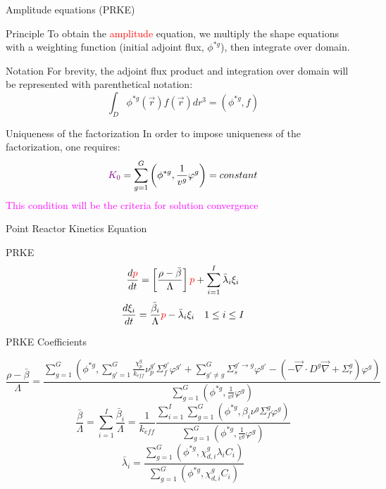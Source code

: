 \documentclass[8pt]{beamer}
\renewcommand{\div}{\vec{\nabla}\! \cdot \!}
\newcommand{\grad}{\vec{\nabla}}
\newcommand{\be}{\begin{equation*}}
\newcommand{\ee}{\end{equation*}}
\newcommand{\keff}{\ensuremath{k_{\textit{eff}}}}
\newcommand{\tcr}[1]{\textcolor{red}{#1}}
\newcommand{\tcm}[1]{\textcolor{magenta}{#1}}
\newcommand{\tcp}[1]{\textcolor{violet}{#1}}
\begin{document}
\begin{frame}{Amplitude equations (PRKE)}

\begin{block}{Principle}
To obtain the \tcr{amplitude} equation, we multiply the shape equations with a weighting 
function (initial adjoint flux, $\phi^{*g}$), then integrate over domain.  
\end{block}

\begin{block}{Notation}
For brevity, the adjoint flux product and integration over domain will be represented with parenthetical notation:
\[
\int_D\phi^{*g}(\vec{r})f(\vec{r})dr^3=\left(\phi^{*g},f\right)
\]
\end{block}


\begin{block}{Uniqueness of the factorization}
In order to impose uniqueness of the factorization, one requires:
\[
\tcp{K_0} = \sum_{g=1}^G\left(\phi^{*g},\frac{1}{v^g}\varphi^g\right)= constant
\]
\tcm{This condition will be the criteria for solution convergence}
\end{block}


\end{frame}

\begin{frame}{Point Reactor Kinetics Equation}
\vspace{-2mm}
\begin{block}{PRKE}
\[
\frac{d\tcr{p}}{dt}=\left[\frac{\rho-\bar{\beta}}{\Lambda}\right]\tcr{p}+\sum_{i=1}^I\bar{\lambda}_i\xi_i
\]
\[
\frac{d\xi_i}{dt}=\frac{\bar{\beta}_i}{\Lambda}\tcr{p} - \bar{\lambda}_i\xi_i \quad 1 \le i \le I 
\]
\end{block}
\begin{block}{PRKE Coefficients}

\small \be
\frac{\rho-\bar{\beta}}{\Lambda}=
\frac{ \sum_{g=1}^G \left(\phi^{*g},\sum_{g'=1}^G\frac{\chi_p^g}{\keff} \nu_p^{g'} \Sigma_f^{g'}\varphi^{g'} + \sum_{g'\neq g}^G\Sigma_s^{g'\to g} \varphi^{g'} -\left( -\div D^g \grad  + \Sigma_r^g \right)\varphi^g\right)}
{\sum_{g=1}^G \left(\phi^{*g},\frac{1}{v^g}\varphi^g\right)}
\ee \normalsize
\be
\frac{\bar{\beta}}{\Lambda}=\sum_{i=1}^I\frac{\bar{\beta}_i}{\Lambda}=\frac{1}{\keff}
\frac{\sum_{i=1}^I\sum_{g=1}^G(\phi^{*g}, \beta_i\nu^{g} \Sigma_f^g \varphi^{g})}
{\sum_{g=1}^G \left(\phi^{*g},\frac{1}{v^g}\varphi^g\right)}
\ee
\be
\bar{\lambda}_i=\frac{\sum_{g=1}^G(\phi^{*g},\chi_{d,i}^g\lambda_i C_i)}{\sum_{g=1}^G(\phi^{*g},\chi_{d,i}^gC_i)}
\ee

\end{block}

\end{frame}
\end{document}
